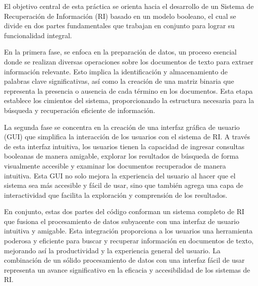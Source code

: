 El objetivo central de esta práctica se orienta hacia el desarrollo de un Sistema de Recuperación de Información (RI) basado en un modelo booleano, el cual se divide en dos partes fundamentales que trabajan en conjunto para lograr su funcionalidad integral.

En la primera fase, se enfoca en la preparación de datos, un proceso esencial donde se realizan diversas operaciones sobre los documentos de texto para extraer información relevante. Esto implica la identificación y almacenamiento de palabras clave significativas, así como la creación de una matriz binaria que representa la presencia o ausencia de cada término en los documentos. Esta etapa establece los cimientos del sistema, proporcionando la estructura necesaria para la búsqueda y recuperación eficiente de información.

La segunda fase se concentra en la creación de una interfaz gráfica de usuario (GUI) que simplifica la interacción de los usuarios con el sistema de RI. A través de esta interfaz intuitiva, los usuarios tienen la capacidad de ingresar consultas booleanas de manera amigable, explorar los resultados de búsqueda de forma visualmente accesible y examinar los documentos recuperados de manera intuitiva. Esta GUI no solo mejora la experiencia del usuario al hacer que el sistema sea más accesible y fácil de usar, sino que también agrega una capa de interactividad que facilita la exploración y comprensión de los resultados.

En conjunto, estas dos partes del código conforman un sistema completo de RI que fusiona el procesamiento de datos subyacente con una interfaz de usuario intuitiva y amigable. Esta integración proporciona a los usuarios una herramienta poderosa y eficiente para buscar y recuperar información en documentos de texto, mejorando así la productividad y la experiencia general del usuario. La combinación de un sólido procesamiento de datos con una interfaz fácil de usar representa un avance significativo en la eficacia y accesibilidad de los sistemas de RI.
